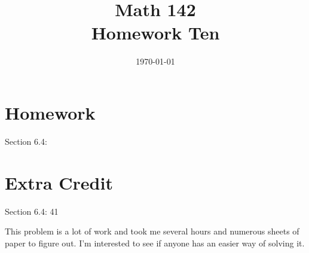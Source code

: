 \documentclass{exam}
\author{}
\date{\today}
\title{Math 142 \\ Homework Ten}
\begin{document}
  \maketitle

  \section{Homework}
  Section 6.4: 

  \section{Extra Credit}
  Section 6.4: 41

  \ifprintanswers
  \else
    This problem is a lot of work and took me several hours and numerous sheets of paper to figure out.  I'm interested to
    see if anyone has an easier way of solving it.
  \fi
\end{document}

